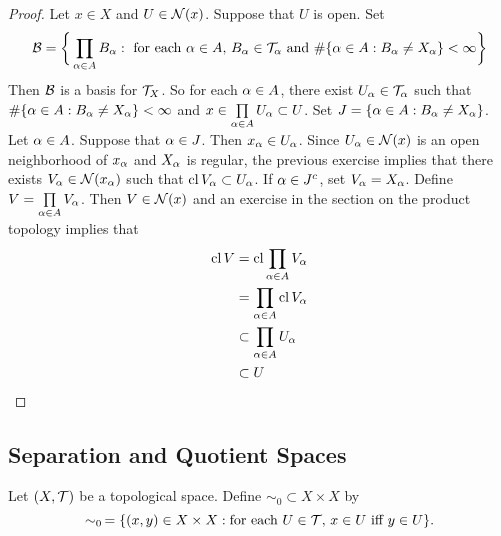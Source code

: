\documentclass{book}
\begin{document}
	\begin{proof}
		Let $x \in X$ and $U \in \mathcal{N}(x)$. Suppose that $U$ is open. Set 
		$$\mathcal{B} = \bigg \{\prod_{\alpha \in A}B_{\alpha}: \text{ for each $\alpha \in A$,  $B_{\alpha} \in \mathcal{T}_{\alpha}$ and $\# \{\alpha \in A: B_{\alpha} \neq X_{\alpha}\} < \infty$} \bigg\}$$
		Then $\mathcal{B}$ is a basis for $\mathcal{T}_{X}$. So for each $\alpha \in A$, there exist $U_{\alpha} \in \mathcal{T}_{\alpha}$ such that $\# \{\alpha \in A: B_{\alpha} \neq X_{\alpha}\} < \infty$ and $x \in \prod\limits_{\alpha \in A} U_{\alpha} \subset U$. Set $J = \{\alpha \in A: B_{\alpha} \neq X_{\alpha}\}$. Let $\alpha \in A$. Suppose that $\alpha \in J$. Then $x_{\alpha} \in U_{\alpha}$. Since $U_{\alpha} \in \mathcal{N}(x)$ is an open neighborhood of $x_{\alpha}$ and $X_{\alpha}$ is regular, the previous exercise implies that there exists $V_{\alpha} \in \mathcal{N}(x_{\alpha})$ such that $\operatorname{cl} V_{\alpha} \subset U_{\alpha}$. If $\alpha \in J^c$, set $V_{\alpha} = X_{\alpha}$. Define $V = \prod\limits_{\alpha \in A} V_{\alpha}$. Then $V \in \mathcal{N}(x)$ and an exercise in the section on the product topology implies that 
		\begin{align*}
			\operatorname{cl} V
			& = \operatorname{cl} \prod_{\alpha \in A} V_{\alpha} \\
			& = \prod_{\alpha \in A} \operatorname{cl} V_{\alpha} \\
			& \subset \prod_{\alpha \in A} U_{\alpha} \\
			& \subset U
		\end{align*} 
	\end{proof}
	
	
	
	
	
	
	
	
	
	
	
	
	
	
	
	
	
	\subsection{Separation and Quotient Spaces}
	
	\begin{defn}
		Let $(X, \mathcal{T})$ be a topological space. Define $\sim_0 \subset X \times X$ by
		$$\sim_0 \, = \{(x,y) \in X \times X: \text{for each $U \in \mathcal{T}$, $x \in U$ iff $y \in U$}\}.$$
	\end{defn}
\end{document}
